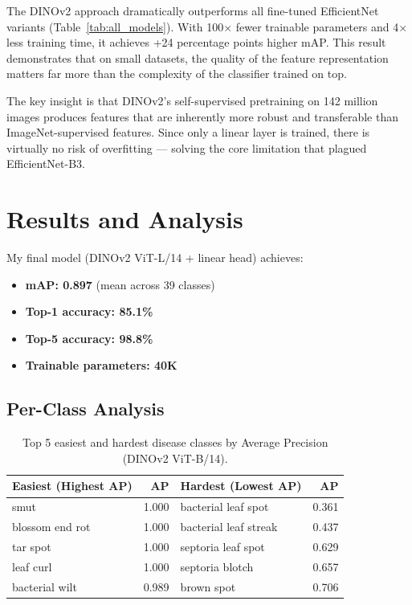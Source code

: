 \documentclass[11pt, a4paper]{article}
\begin{document}
The DINOv2 approach dramatically outperforms all fine-tuned EfficientNet variants (Table~\ref{tab:all_models}). With 100$\times$ fewer trainable parameters and 4$\times$ less training time, it achieves +24 percentage points higher mAP. This result demonstrates that on small datasets, the quality of the feature representation matters far more than the complexity of the classifier trained on top.

The key insight is that DINOv2's self-supervised pretraining on 142 million images produces features that are inherently more robust and transferable than ImageNet-supervised features. Since only a linear layer is trained, there is virtually no risk of overfitting --- solving the core limitation that plagued EfficientNet-B3.

\section{Results and Analysis}

My final model (DINOv2 ViT-L/14 + linear head) achieves:
\begin{itemize}
    \item \textbf{mAP: 0.897} (mean across 39 classes)
    \item \textbf{Top-1 accuracy: 85.1\%}
    \item \textbf{Top-5 accuracy: 98.8\%}
    \item \textbf{Trainable parameters: 40K}
\end{itemize}

\subsection{Per-Class Analysis}

\begin{table}[H]
\centering
\caption{Top 5 easiest and hardest disease classes by Average Precision (DINOv2 ViT-B/14).}
\begin{tabular}{lr|lr}
\toprule
\textbf{Easiest (Highest AP)} & \textbf{AP} & \textbf{Hardest (Lowest AP)} & \textbf{AP} \\
\midrule
smut & 1.000 & bacterial leaf spot & 0.361 \\
blossom end rot & 1.000 & bacterial leaf streak & 0.437 \\
tar spot & 1.000 & septoria leaf spot & 0.629 \\
leaf curl & 1.000 & septoria blotch & 0.657 \\
bacterial wilt & 0.989 & brown spot & 0.706 \\
\bottomrule
\end{tabular}
\label{tab:perclass}
\end{table}
\end{document}
